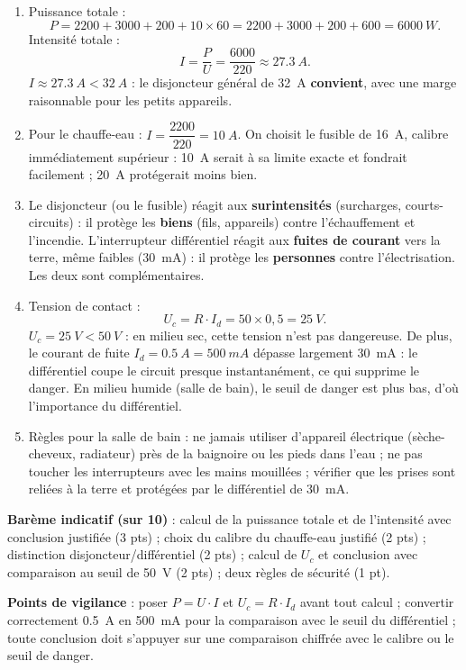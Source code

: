 \documentclass[11pt]{article}
\begin{document}
\begin{corrige}
\begin{enumerate}
\item Puissance totale :
\[ P = 2200 + 3000 + 200 + 10 \times 60 = 2200 + 3000 + 200 + 600 = \SI{6000}{W}. \]
Intensité totale :
\[ I = \frac{P}{U} = \frac{6000}{220} \approx \SI{27,3}{A}. \]
$I \approx \SI{27,3}{A} < \SI{32}{A}$ : le disjoncteur général de \SI{32}{A} \textbf{convient}, avec une marge raisonnable pour les petits appareils.
\item Pour le chauffe-eau : $I = \dfrac{2200}{220} = \SI{10}{A}$. On choisit le fusible de \SI{16}{A}, calibre immédiatement supérieur : \SI{10}{A} serait à sa limite exacte et fondrait facilement ; \SI{20}{A} protégerait moins bien.
\item Le disjoncteur (ou le fusible) réagit aux \textbf{surintensités} (surcharges, courts-circuits) : il protège les \textbf{biens} (fils, appareils) contre l'échauffement et l'incendie. L'interrupteur différentiel réagit aux \textbf{fuites de courant} vers la terre, même faibles (\SI{30}{mA}) : il protège les \textbf{personnes} contre l'électrisation. Les deux sont complémentaires.
\item Tension de contact :
\[ U_c = R \cdot I_d = 50 \times 0,5 = \SI{25}{V}. \]
$U_c = \SI{25}{V} < \SI{50}{V}$ : en milieu sec, cette tension n'est pas dangereuse. De plus, le courant de fuite $I_d = \SI{0,5}{A} = \SI{500}{mA}$ dépasse largement \SI{30}{mA} : le différentiel coupe le circuit presque instantanément, ce qui supprime le danger. En milieu humide (salle de bain), le seuil de danger est plus bas, d'où l'importance du différentiel.
\item Règles pour la salle de bain : ne jamais utiliser d'appareil électrique (sèche-cheveux, radiateur) près de la baignoire ou les pieds dans l'eau ; ne pas toucher les interrupteurs avec les mains mouillées ; vérifier que les prises sont reliées à la terre et protégées par le différentiel de \SI{30}{mA}.
\end{enumerate}
\textbf{Barème indicatif (sur 10)} : calcul de la puissance totale et de l'intensité avec conclusion justifiée (3 pts) ; choix du calibre du chauffe-eau justifié (2 pts) ; distinction disjoncteur/différentiel (2 pts) ; calcul de $U_c$ et conclusion avec comparaison au seuil de \SI{50}{V} (2 pts) ; deux règles de sécurité (1 pt).\par
\textbf{Points de vigilance} : poser $P = U \cdot I$ et $U_c = R \cdot I_d$ avant tout calcul ; convertir correctement \SI{0,5}{A} en \SI{500}{mA} pour la comparaison avec le seuil du différentiel ; toute conclusion doit s'appuyer sur une comparaison chiffrée avec le calibre ou le seuil de danger.
\end{corrige}
\end{document}
